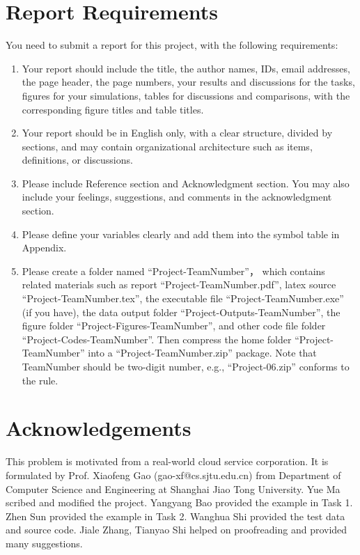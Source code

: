 \documentclass{llncs}
\begin{document}
\section{Report Requirements}

You need to submit a report for this project, with the following requirements:

\begin{enumerate}
  \item Your report should include the title, the author names, IDs, email addresses, the page header, the page numbers, your results and discussions for the tasks, figures for your simulations, tables for discussions and comparisons, with the corresponding figure titles and table titles.
  
  \item Your report should be in English only, with a clear structure, divided by sections, and may contain organizational architecture such as items, definitions, or discussions.
  
  \item Please include Reference section and Acknowledgment section. You may also include your feelings, suggestions, and comments in the acknowledgment section.
  
  \item Please define your variables clearly and add them into the symbol table in Appendix.
  
  \item Please create a folder named ``Project-TeamNumber''， which contains related materials such as report ``Project-TeamNumber.pdf'', latex source ``Project-TeamNumber.tex'', the executable file ``Project-TeamNumber.exe'' (if you have), the data output folder ``Project-Outputs-TeamNumber'', the figure folder ``Project-Figures-TeamNumber'', and other code file folder  ``Project-Codes-TeamNumber''. Then compress the home folder ``Project-TeamNumber'' into a ``Project-TeamNumber.zip'' package. Note that TeamNumber should be two-digit number, e.g., ``Project-06.zip'' conforms to the rule.
\end{enumerate}





\section*{Acknowledgements}
This problem is motivated from a real-world cloud service corporation. It is formulated by Prof. Xiaofeng Gao (gao-xf@cs.sjtu.edu.cn) from Department of Computer Science and Engineering at Shanghai Jiao Tong University. Yue Ma scribed and modified the project. Yangyang Bao provided the example in Task 1. Zhen Sun provided the example in Task 2. Wanghua Shi provided the test data and source code. Jiale Zhang, Tianyao Shi helped on proofreading and provided many suggestions.
\end{document}
